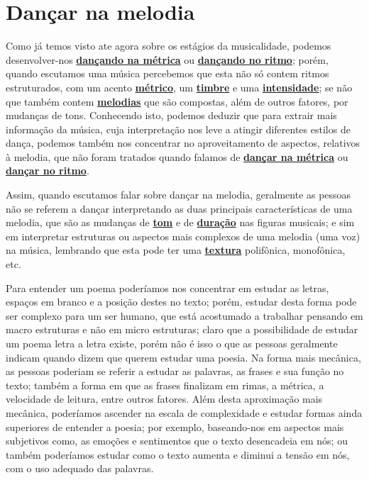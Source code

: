 

\newpage
\section{Dançar na melodia}
\label{subsec:dancamelodia}

Como já temos visto ate agora sobre os estágios da musicalidade, 
 podemos desenvolver-nos  \hyperref[subsec:dancametrica]{\textbf{dançando na métrica}}  
ou \hyperref[subsec:dancaritmo]{\textbf{dançando no ritmo}};
porém, quando escutamos uma música percebemos que esta não só contem ritmos estruturados, 
com um acento \hyperref[def:Metrica]{\textbf{métrico}}, um \hyperref[sec:pos:timbre]{\textbf{timbre}} 
e uma \hyperref[sec:pos:Intensidade]{\textbf{intensidade}};
se não que também contem \hyperref[sec:pos:Melodia]{\textbf{melodias}} que são compostas, além de outros fatores, 
por mudanças de tons.
Conhecendo isto, 
podemos deduzir que para extrair mais informação da música,
cuja interpretação nos leve a atingir diferentes estilos de dança,
podemos também nos concentrar no aproveitamento de aspectos, relativos à melodia, que não foram tratados 
quando falamos de \hyperref[subsec:dancametrica]{\textbf{dançar na métrica}} ou 
\hyperref[subsec:dancaritmo]{\textbf{dançar no ritmo}}.


Assim, quando escutamos falar sobre dançar na melodia,
geralmente as pessoas não se referem a dançar interpretando as duas principais características de uma melodia,
que são as mudanças de \hyperref[sec:pos:Altura]{\textbf{tom}} e de
\hyperref[sec:pos:Duracion]{\textbf{duração}} nas figuras musicais;
e sim em interpretar estruturas ou aspectos mais complexos de uma melodia (uma voz) na música,
lembrando que esta pode ter uma \hyperref[sec:texturasmusica]{\textbf{textura}} polifônica, monofônica, etc. 


\begin{example}
Para entender um poema poderíamos nos concentrar em estudar as letras, 
espaços em branco  e a posição destes no texto;
porém, estudar desta forma pode ser complexo para um ser humano,
que está acostumado a trabalhar pensando em macro estruturas e não em micro estruturas;
claro que a possibilidade de estudar um poema letra a letra existe,
porém não é isso o que as pessoas geralmente indicam quando dizem que querem estudar uma poesia.
Na forma mais mecânica, 
as pessoas poderiam se referir a estudar as palavras, as frases e sua função no texto;
também a forma em que as frases finalizam em rimas, a métrica,
a velocidade de leitura, entre outros fatores.
Além desta aproximação mais mecânica, 
poderíamos ascender na escala de complexidade e estudar formas ainda superiores de entender a poesia;
por exemplo, baseando-nos em aspectos mais subjetivos como, 
as emoções e sentimentos  que o texto desencadeia em nós;
ou também poderíamos estudar como o texto aumenta e diminui a tensão em nós,
 com o uso adequado das palavras.
\end{example}

